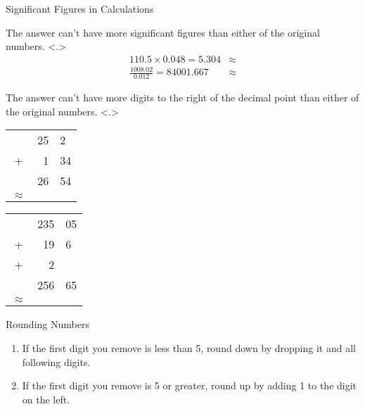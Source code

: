 \documentclass[10pt,letterpaper,twoside]{article}
\begin{document}
\begin{frame}[t]{Significant Figures in Calculations}
	\begin{description}
		\item<+->[Multiplication or Division:] The answer can't have more
			\alert{significant figures} than either of the original numbers.
			\only<.>{
				\begin{align*}
					110.5 \times 0.048 = 5.304 &\approx \\
					\frac{1008.02}{0.012} = 84001.667
					&\approx
				\end{align*}}
		\item<+->[Addition or Subtraction:] The answer can't have more
		digits to the \alert{right} of the \alert{decimal point} than
			either of the original numbers.
			\only<.>{
				\begin{center}
				\begin{tabular} {c r@{.}l}
					& 25 & 2 \\
					+ & 1 & 34 \\ \midrule
					& 26 & 54 \\
					$\approx$
				\end{tabular}
					\qquad
				\begin{tabular} {c r@{.}l}
					& 235 & 05 \\
					+ & 19 & 6 \\
					+ & 2 \\ \midrule
					& 256 & 65 \\
					$\approx$
				\end{tabular}
				\end{center}}
	\end{description}

\end{frame}

\begin{frame}{Rounding Numbers}
	\begin{enumerate}
		\item<1-> If the first digit you remove is less than 5, round
			down by dropping it and all following digits.
		\item<2-> If the first digit you remove is 5 or greater, round
			up by adding 1 to the digit on the left.
	\end{enumerate}

\end{frame}
\end{document}
